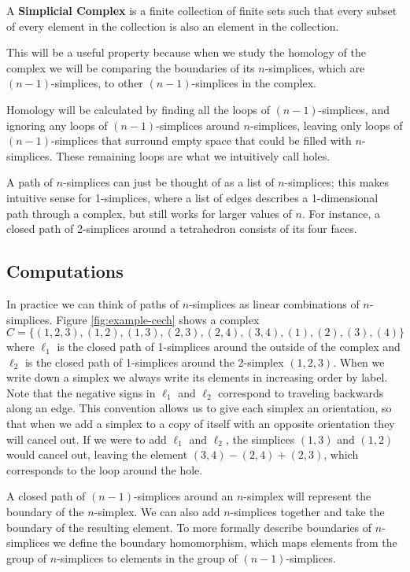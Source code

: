 \begin{definition}\label{def:simplicial-complex}
    A \textbf{Simplicial Complex} is a finite collection of finite sets such that every subset of every element in the collection is also an element in the collection. \cite{wagner}
\end{definition}

This will be a useful property because when we study the homology of the complex we will be comparing the boundaries of its \(n\)-simplices, which are \((n-1)\)-simplices, to other \((n-1)\)-simplices in the complex.

Homology will be calculated by finding all the loops of \((n-1)\)-simplices, and ignoring any loops of \((n-1)\)-simplices around \(n\)-simplices, leaving only loops of \((n-1)\)-simplices that surround empty space that could be filled with \(n\)-simplices.
These remaining loops are what we intuitively call holes.

A path of \(n\)-simplices can just be thought of as a list of \(n\)-simplices; this makes intuitive sense for 1-simplices, where a list of edges describes a 1-dimensional path through a complex, but still works for larger values of \(n\).
For instance, a closed path of 2-simplices around a tetrahedron consists of its four faces.

\subsection{Computations}

In practice we can think of paths of \(n\)-simplices as linear combinations of \(n\)-simplices.
Figure \ref{fig:example-cech} shows a complex \(C = \{ (1,2,3), (1,2), (1,3), (2,3), (2,4), (3,4), (1), (2), (3), (4) \}\) where \(\ell_1\) is the closed path of 1-simplices around the outside of the complex and \(\ell_2\) is the closed path of 1-simplices around the 2-simplex \((1,2,3)\).
When we write down a simplex we always write its elements in increasing order by label.
Note that the negative signs in \(\ell_1\) and \(\ell_2\) correspond to traveling backwards along an edge.
This convention allows us to give each simplex an orientation, so that when we add a simplex to a copy of itself with an opposite orientation they will cancel out.
If we were to add \(\ell_1\) and \(\ell_2\), the simplices \((1, 3)\) and \((1, 2)\) would cancel out, leaving the element \((3, 4) - (2, 4) + (2, 3)\), which corresponds to the loop around the hole.

A closed path of \((n-1)\)-simplices around an \(n\)-simplex will represent the boundary of the \(n\)-simplex. We can also add \(n\)-simplices together and take the boundary of the resulting element. To more formally describe boundaries of \(n\)-simplices we define the boundary homomorphism, which maps elements from the group of \(n\)-simplices to elements in the group of \((n-1)\)-simplices.

